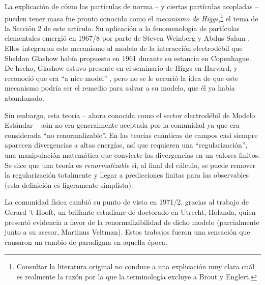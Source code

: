 La explicaci\'on de c\'omo  las part\'iculas de norma -- y ciertas part\'iculas
acopladas -- pueden tener masa fue pronto conocida como el {\em mecanismo
de Higgs},\footnote{Consultar la literatura original no conduce a
  una explicaci\'on muy clara cu\'al es realmente la raz\'on por la que la
  terminolog\'ia excluye a Brout y Englert.}
  el tema de la Secci\'on 2 de este art\'iculo.
Su aplicaci\'on a la fenomenolog\'ia de part\'iculas elementales 
emergi\'o en 1967/8 por parte de Steven Weinberg \cite{Weinberg} y
Abdus Salam \cite{Salam}.
Ellos integraron este mecanismo al modelo de la interacci\'on
electrod\'ebil que Sheldon Glashow hab\'ia propuesto en 1961
\cite{Glashow} durante su estancia en Copenhague.
De hecho, Glashow estuvo presente en el seminario de Higgs en Harvard,
y reconoci\'o que era ``a nice model'' \cite{boson}, pero no se le
occuri\'o la idea de que este mecanismo podr\'ia ser el remedio
para salvar a su modelo, que \'el ya hab\'ia abandonado.

Sin embargo, esta teor\'ia -- ahora conocida como el sector
electrod\'ebil de Modelo Est\'andar -- a\'un no era generalmente aceptada
por la comunidad ya que era considerada ``no renormalizable''.
En las teor\'ias cu\'anticas de campos casi siempre aparecen divergencias
a altas energ\'ias, as\'i que requieren una ``regularizaci\'on'',
una manipulaci\'on matem\'atica que convierte las divergencias
en un valores finitos. Se dice que una teor\'ia es {\em renormalizable}
si, al final del c\'alculo, se puede remover la regularizaci\'on
totalmente y llegar a predicciones finitas para las observables
(esta definici\'on es ligeramente simplista).

La comunidad f\'isica cambi\'o su punto de vista en 1971/2, gracias
al trabajo de Gerard 't Hooft, un brillante estudiane de doctorado
en Utrecht, Holanda, quien present\'o evidencia a favor de la
renormalizibilidad de dicho modelo (parcialmente junto a
su asesor, Martinus Veltman). Estos trabajos \cite{tHooft} fueron
una sensaci\'on que causaron un cambio de paradigma en aquella \'epoca.

